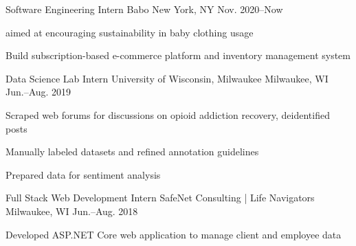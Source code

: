 \documentclass[10pt, letterpaper]{awesome-cv}
\begin{document}
\begin{cventries}

    \cventry
        {Software Engineering Intern}
        {Babo}
        {New York, NY}
        {Nov. 2020--Now}
        {\begin{cvitems}
            \item aimed at encouraging sustainability in baby clothing usage
            \item Build subscription-based e-commerce platform and inventory management system
        \end{cvitems}}   
        
    \cventry
        {Data Science Lab Intern}
        {University of Wisconsin, Milwaukee}
        {Milwaukee, WI}
        {Jun.--Aug. 2019}
        {\begin{cvitems} 
            \item Scraped web forums for discussions on opioid addiction recovery, deidentified posts
            \item Manually labeled datasets and refined annotation guidelines
            \item Prepared data for sentiment analysis
        \end{cvitems}}
    
    \cventry
        {Full Stack Web Development Intern}
        {SafeNet Consulting | Life Navigators}
        {Milwaukee, WI}
        {Jun.--Aug. 2018}
        {\begin{cvitems} 
            \item Developed ASP.NET Core web application to manage client and employee data
        \end{cvitems}}
        

\end{cventries}

%        
\end{document}
